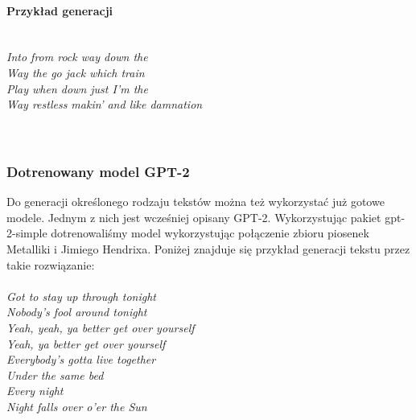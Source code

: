 \documentclass{article}
\begin{document}
\paragraph{Przykład generacji}
\leavevmode\\
\textsl{
	Into from rock way down the \\
	Way the go jack which train \\
	Play when down just I'm the \\
	Way restless makin' and like damnation}
\leavevmode\\\leavevmode\\
\leavevmode\\
\newpage
\subsubsection{Dotrenowany model GPT-2}
Do generacji określonego rodzaju tekstów można też wykorzystać już gotowe modele. Jednym z nich jest wcześniej opisany GPT-2.
Wykorzystując pakiet gpt-2-simple dotrenowaliśmy model wykorzystując połączenie zbioru piosenek Metalliki i Jimiego Hendrixa.
Poniżej znajduje się przykład generacji tekstu przez takie rozwiązanie: \\
\leavevmode\\
\textsl{
	Got to stay up through tonight \\
	Nobody's fool around tonight \\
	Yeah, yeah, ya better get over yourself \\
	Yeah, ya better get over yourself \\
	Everybody's gotta live together \\
	Under the same bed \\
	Every night \\
	Night falls over o'er the Sun}
\leavevmode\\\leavevmode\\
\leavevmode\\
\end{document}
